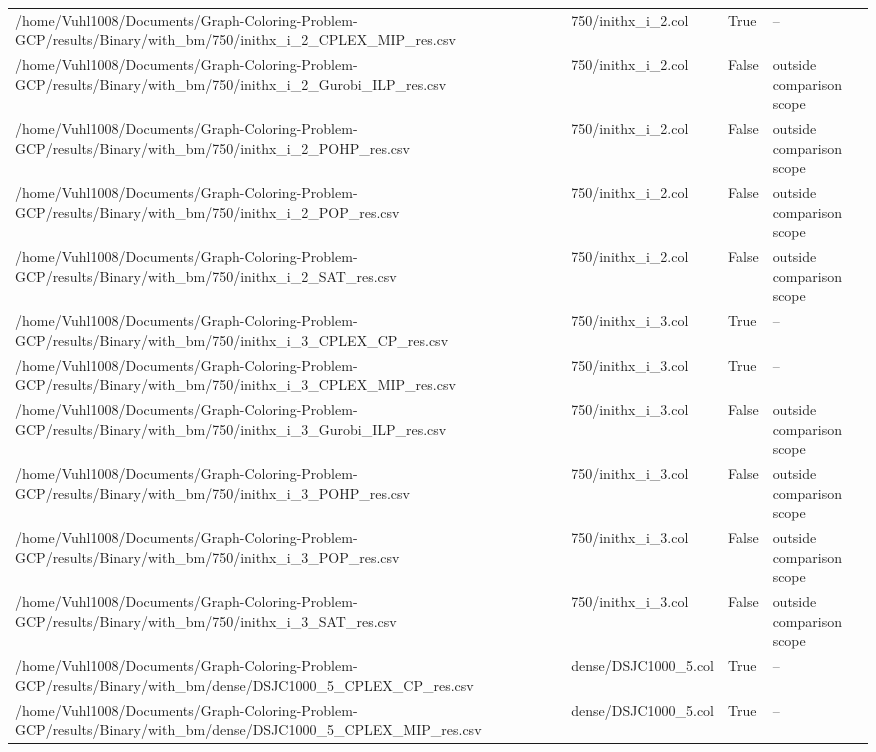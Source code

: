 \begin{table}[htbp]
\begin{tabular}{llll}
/home/Vuhl1008/Documents/Graph-Coloring-Problem-GCP/results/Binary/with\_bm/750/inithx\_i\_2\_CPLEX\_MIP\_res.csv & 750/inithx\_i\_2.col & True & -- \\
/home/Vuhl1008/Documents/Graph-Coloring-Problem-GCP/results/Binary/with\_bm/750/inithx\_i\_2\_Gurobi\_ILP\_res.csv & 750/inithx\_i\_2.col & False & outside comparison scope \\
/home/Vuhl1008/Documents/Graph-Coloring-Problem-GCP/results/Binary/with\_bm/750/inithx\_i\_2\_POHP\_res.csv & 750/inithx\_i\_2.col & False & outside comparison scope \\
/home/Vuhl1008/Documents/Graph-Coloring-Problem-GCP/results/Binary/with\_bm/750/inithx\_i\_2\_POP\_res.csv & 750/inithx\_i\_2.col & False & outside comparison scope \\
/home/Vuhl1008/Documents/Graph-Coloring-Problem-GCP/results/Binary/with\_bm/750/inithx\_i\_2\_SAT\_res.csv & 750/inithx\_i\_2.col & False & outside comparison scope \\
/home/Vuhl1008/Documents/Graph-Coloring-Problem-GCP/results/Binary/with\_bm/750/inithx\_i\_3\_CPLEX\_CP\_res.csv & 750/inithx\_i\_3.col & True & -- \\
/home/Vuhl1008/Documents/Graph-Coloring-Problem-GCP/results/Binary/with\_bm/750/inithx\_i\_3\_CPLEX\_MIP\_res.csv & 750/inithx\_i\_3.col & True & -- \\
/home/Vuhl1008/Documents/Graph-Coloring-Problem-GCP/results/Binary/with\_bm/750/inithx\_i\_3\_Gurobi\_ILP\_res.csv & 750/inithx\_i\_3.col & False & outside comparison scope \\
/home/Vuhl1008/Documents/Graph-Coloring-Problem-GCP/results/Binary/with\_bm/750/inithx\_i\_3\_POHP\_res.csv & 750/inithx\_i\_3.col & False & outside comparison scope \\
/home/Vuhl1008/Documents/Graph-Coloring-Problem-GCP/results/Binary/with\_bm/750/inithx\_i\_3\_POP\_res.csv & 750/inithx\_i\_3.col & False & outside comparison scope \\
/home/Vuhl1008/Documents/Graph-Coloring-Problem-GCP/results/Binary/with\_bm/750/inithx\_i\_3\_SAT\_res.csv & 750/inithx\_i\_3.col & False & outside comparison scope \\
/home/Vuhl1008/Documents/Graph-Coloring-Problem-GCP/results/Binary/with\_bm/dense/DSJC1000\_5\_CPLEX\_CP\_res.csv & dense/DSJC1000\_5.col & True & -- \\
/home/Vuhl1008/Documents/Graph-Coloring-Problem-GCP/results/Binary/with\_bm/dense/DSJC1000\_5\_CPLEX\_MIP\_res.csv & dense/DSJC1000\_5.col & True & -- \\

\end{tabular}
\end{table}
